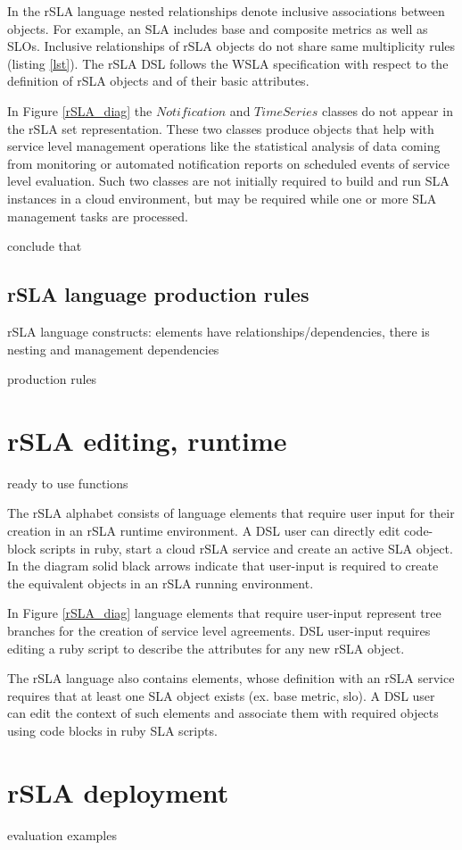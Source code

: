 \documentclass{llncs}
\begin{document}
In the rSLA language nested relationships denote inclusive associations between objects. For example, an SLA includes base and composite metrics as well as SLOs. Inclusive relationships of rSLA objects do not share same multiplicity rules (listing \ref{lst}). The rSLA DSL follows the WSLA specification \cite{wsla} with respect to the definition of rSLA objects and of their basic attributes.

In Figure \ref{rSLA_diag} the $Notification$ and $TimeSeries$ classes do not appear in the rSLA set representation. These two classes produce objects that help with service level management operations like the statistical analysis of data coming from monitoring or automated notification reports on scheduled events of service level evaluation. Such two classes are not initially required to build and run SLA instances in a cloud environment, but may be required while one or more SLA management tasks are processed.



conclude that
 
\subsection{rSLA language production rules}

rSLA language constructs: elements have relationships/dependencies, there is nesting and management dependencies

production rules

\section{rSLA editing, runtime}
ready to use functions

The rSLA alphabet consists of language elements that require user input for their creation in an rSLA runtime environment. A DSL user can directly edit code-block scripts in ruby, start a cloud rSLA service and create an active SLA object. In the diagram solid black arrows indicate that user-input is required to create the equivalent objects in an rSLA running environment. 

In Figure \ref{rSLA_diag} language elements that require user-input represent tree branches for the creation of service level agreements. DSL user-input requires editing a ruby script to describe the attributes for any new rSLA object. 

The rSLA language also contains elements, whose definition with an rSLA service requires that at least one SLA object exists (ex. base metric, slo). A DSL user can edit the context of such elements and associate them with required objects using code blocks in ruby SLA scripts.

\section{rSLA deployment }
evaluation examples



\end{document}

